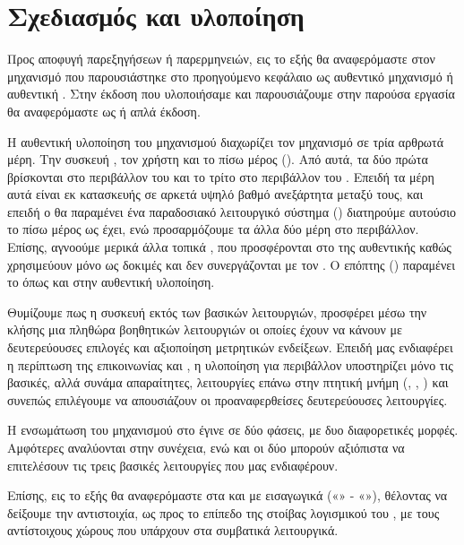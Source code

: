 \chapter{Σχεδιασμός και υλοποίηση}

Προς αποφυγή παρεξηγήσεων ή παρερμηνειών, εις το εξής θα αναφερόμαστε στον μηχανισμό
 που παρουσιάστηκε στο προηγούμενο κεφάλαιο ως αυθεντικό μηχανισμό
ή αυθεντική . Στην έκδοση που υλοποιήσαμε και παρουσιάζουμε στην παρούσα
εργασία θα αναφερόμαστε ως  ή απλά  έκδοση.

Η αυθεντική υλοποίηση του μηχανισμού  διαχωρίζει τον
μηχανισμό σε τρία αρθρωτά μέρη. Την συσκευή , τον χρήστη
 και το πίσω μέρος ()\cite{paperAimiliou}. Από αυτά, τα δύο πρώτα
βρίσκονται στο περιβάλλον του  και το τρίτο στο περιβάλλον
του . Επειδή τα μέρη αυτά είναι εκ κατασκευής σε αρκετά
υψηλό βαθμό ανεξάρτητα μεταξύ τους, και επειδή ο  θα
παραμένει ένα παραδοσιακό  λειτουργικό σύστημα ()
διατηρούμε αυτούσιο το πίσω μέρος ως έχει, ενώ προσαρμόζουμε
τα άλλα δύο μέρη στο  περιβάλλον. Επίσης, αγνοούμε
μερικά άλλα τοπικά , που προσφέρονται στο 
της αυθεντικής  καθώς χρησιμεύουν μόνο ως δοκιμές και δεν
συνεργάζονται με τον . Ο επόπτης ()
παραμένει το  όπως και στην αυθεντική υλοποίηση.
\newline

Θυμίζουμε πως η συσκευή  εκτός των βασικών λειτουργιών,
προσφέρει μέσω την  κλήσης μια πληθώρα βοηθητικών
λειτουργιών οι οποίες έχουν να κάνουν με δευτερεύουσες
επιλογές και αξιοποίηση μετρητικών ενδείξεων. Επειδή μας
ενδιαφέρει η περίπτωση της επικοινωνίας  και , η
υλοποίηση για  περιβάλλον υποστηρίζει μόνο τις
βασικές, αλλά συνάμα απαραίτητες, λειτουργίες επάνω στην πτητική
μνήμη (, , )
και συνεπώς επιλέγουμε να απουσιάζουν οι προαναφερθείσες δευτερεύουσες λειτουργίες.
\newline

Η ενσωμάτωση του μηχανισμού  στο  έγινε σε δύο φάσεις,
με δυο διαφορετικές μορφές.
Αμφότερες αναλύονται στην συνέχεια, ενώ και οι δύο μπορούν
αξιόπιστα να επιτελέσουν τις τρεις βασικές λειτουργίες 
που μας ενδιαφέρουν.
\newline

Επίσης, εις το εξής θα αναφερόμαστε στα  και 
με εισαγωγικά («» - «»), θέλοντας να
δείξουμε την αντιστοιχία, ως προς το επίπεδο της στοίβας
λογισμικού του , με τους αντίστοιχους χώρους που υπάρχουν στα
συμβατικά λειτουργικά.
\newline

